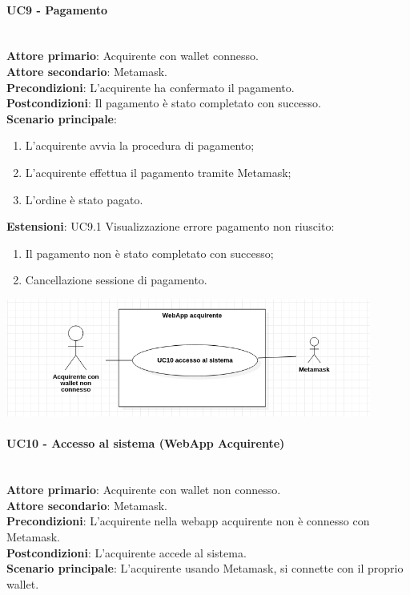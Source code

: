 \documentclass[a4paper, 12pt]{article}
\begin{document}
\paragraph{UC9 - Pagamento}\\
\textbf{Attore primario}: Acquirente con wallet connesso.\\
\textbf{Attore secondario}: Metamask.\\
\textbf{Precondizioni}: L'acquirente ha confermato il pagamento.\\
\textbf{Postcondizioni}: Il pagamento è stato completato con successo.\\
\textbf{Scenario principale}:
\begin{enumerate}
    \item L'acquirente avvia la procedura di pagamento;
    \item L'acquirente effettua il pagamento tramite Metamask;
    \item L'ordine è stato pagato.
\end{enumerate}
\textbf{Estensioni}:
UC9.1 Visualizzazione errore pagamento non riuscito:
\begin{enumerate}
    \item Il pagamento non è stato completato con successo;
    \item Cancellazione sessione di pagamento.
\end{enumerate}

\includegraphics[width=0.9\textwidth]{UC_WAA1}

\paragraph{UC10 - Accesso al sistema (WebApp Acquirente)}\\
\textbf{Attore primario}: Acquirente con wallet non connesso.\\
\textbf{Attore secondario}: Metamask.\\
\textbf{Precondizioni}: L'acquirente nella webapp acquirente non è connesso con Metamask.\\
\textbf{Postcondizioni}: L'acquirente accede al sistema.\\
\textbf{Scenario principale}:
L'acquirente usando Metamask, si connette con il proprio wallet.
\end{document}
